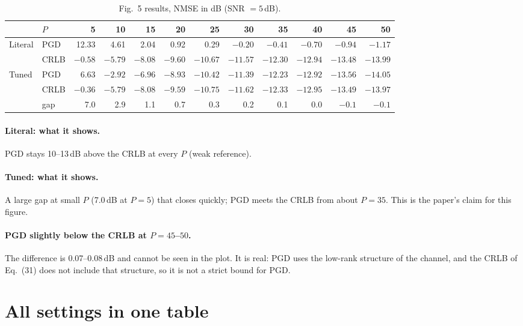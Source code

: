 \documentclass[11pt,a4paper]{article}
\begin{document}
\begin{table}[h!]
\centering
\footnotesize
\caption{Fig.~5 results, NMSE in dB (SNR $=5$\,dB).}
\label{tab:fig5res}
\begin{tabular}{llrrrrrrrrrr}
\toprule
& $P$ & 5 & 10 & 15 & 20 & 25 & 30 & 35 & 40 & 45 & 50 \\
\midrule
Literal & PGD  & 12.33 & 4.61 & 2.04 & 0.92 & 0.29 & $-0.20$ & $-0.41$ & $-0.70$ & $-0.94$ & $-1.17$ \\
        & CRLB & $-0.58$ & $-5.79$ & $-8.08$ & $-9.60$ & $-10.67$ & $-11.57$ & $-12.30$ & $-12.94$ & $-13.48$ & $-13.99$ \\
Tuned   & PGD  & 6.63 & $-2.92$ & $-6.96$ & $-8.93$ & $-10.42$ & $-11.39$ & $-12.23$ & $-12.92$ & $-13.56$ & $-14.05$ \\
        & CRLB & $-0.36$ & $-5.79$ & $-8.08$ & $-9.59$ & $-10.75$ & $-11.62$ & $-12.33$ & $-12.95$ & $-13.49$ & $-13.97$ \\
        & gap  & 7.0 & 2.9 & 1.1 & 0.7 & 0.3 & 0.2 & 0.1 & 0.0 & $-0.1$ & $-0.1$ \\
\bottomrule
\end{tabular}
\end{table}

\paragraph{Literal: what it shows.} PGD stays 10--13\,dB above the CRLB at every $P$ (weak reference).

\paragraph{Tuned: what it shows.} A large gap at small $P$ (7.0\,dB at $P=5$) that closes quickly;
PGD meets the CRLB from about $P=35$. This is the paper's claim for this figure.

\paragraph{PGD slightly below the CRLB at $P=45$--$50$.} The difference is 0.07--0.08\,dB and cannot
be seen in the plot. It is real: PGD uses the low-rank structure of the channel, and the CRLB of
Eq.~(31) does not include that structure, so it is not a strict bound for PGD.

\section{All settings in one table}
\end{document}
